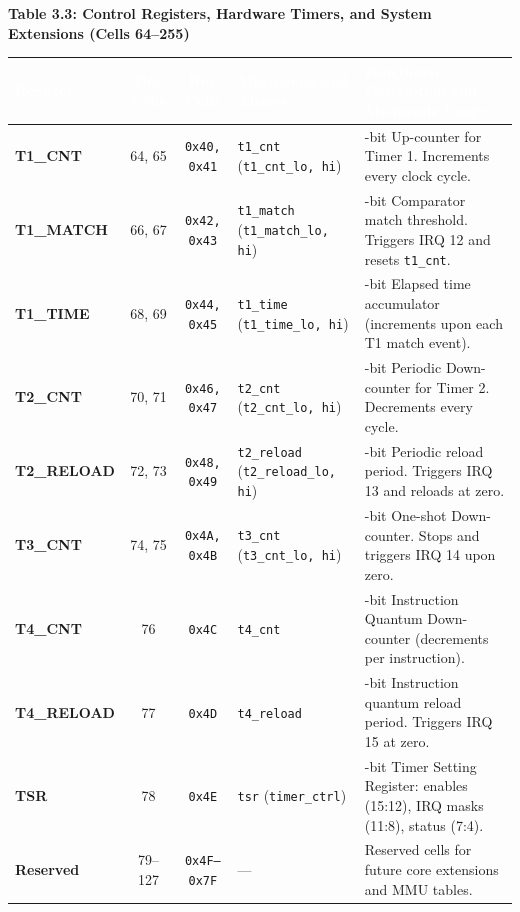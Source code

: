 \documentclass[11pt,a4paper]{article}
\renewcommand{\arraystretch}{1.25}
\begin{document}
\clearpage

\noindent\textbf{Table 3.3: Control Registers, Hardware Timers, and System Extensions (Cells 64--255)}
\par\vspace{1.5mm}\noindent
{\footnotesize
\renewcommand{\arraystretch}{0.90}
\begin{tabularx}{\textwidth}{@{} l c c l >{\raggedright\arraybackslash}X @{}}
\toprule
\rowcolor{limslate}
\textcolor{white}{\textbf{Register}} & \textcolor{white}{\textbf{Dec Cells}} & \textcolor{white}{\textbf{Hex Cells}} & \textcolor{white}{\textbf{Mnemonics and Aliases}} & \textcolor{white}{\textbf{Functional Description and Microcode Usage}} \\
\midrule
\rowcolors{2}{limroweven}{white}
\textbf{T1\_CNT} & 64, 65 & \texttt{0x40, 0x41} & \texttt{t1\_cnt} (\texttt{t1\_cnt\_lo, hi}) & 32-bit Up-counter for Timer 1. Increments every clock cycle. \\
\textbf{T1\_MATCH} & 66, 67 & \texttt{0x42, 0x43} & \texttt{t1\_match} (\texttt{t1\_match\_lo, hi}) & 32-bit Comparator match threshold. Triggers IRQ 12 and resets \texttt{t1\_cnt}. \\
\textbf{T1\_TIME} & 68, 69 & \texttt{0x44, 0x45} & \texttt{t1\_time} (\texttt{t1\_time\_lo, hi}) & 32-bit Elapsed time accumulator (increments upon each T1 match event). \\
\textbf{T2\_CNT} & 70, 71 & \texttt{0x46, 0x47} & \texttt{t2\_cnt} (\texttt{t2\_cnt\_lo, hi}) & 32-bit Periodic Down-counter for Timer 2. Decrements every cycle. \\
\textbf{T2\_RELOAD} & 72, 73 & \texttt{0x48, 0x49} & \texttt{t2\_reload} (\texttt{t2\_reload\_lo, hi}) & 32-bit Periodic reload period. Triggers IRQ 13 and reloads at zero. \\
\textbf{T3\_CNT} & 74, 75 & \texttt{0x4A, 0x4B} & \texttt{t3\_cnt} (\texttt{t3\_cnt\_lo, hi}) & 32-bit One-shot Down-counter. Stops and triggers IRQ 14 upon zero. \\
\textbf{T4\_CNT} & 76 & \texttt{0x4C} & \texttt{t4\_cnt} & 16-bit Instruction Quantum Down-counter (decrements per instruction). \\
\textbf{T4\_RELOAD} & 77 & \texttt{0x4D} & \texttt{t4\_reload} & 16-bit Instruction quantum reload period. Triggers IRQ 15 at zero. \\
\textbf{TSR} & 78 & \texttt{0x4E} & \texttt{tsr} (\texttt{timer\_ctrl}) & 16-bit Timer Setting Register: enables (15:12), IRQ masks (11:8), status (7:4). \\
\textbf{Reserved} & 79--127 & \texttt{0x4F--0x7F} & --- & 49 Reserved cells for future core extensions and MMU tables. \\

\end{tabularx}}
\end{document}
